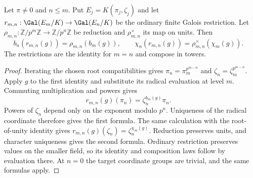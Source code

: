 \begin{lemma}
\label{ft:coordinate-transitions}
\leanok
Let $\pi\ne0$ and $n\leq m$. Put $E_j=K(\pi_j,\zeta_j)$ and
let $r_{m,n}:\Gal(E_m/K)\to\Gal(E_n/K)$ be the ordinary finite
Galois restriction. Let $\rho_{m,n}:\mathbb Z/p^m\mathbb Z\to
\mathbb Z/p^n\mathbb Z$ be reduction and $\rho_{m,n}^{\times}$ its
map on units. Then
\[
 b_n(r_{m,n}(g))=\rho_{m,n}(b_m(g)),\qquad
 \chi_n(r_{m,n}(g))=\rho_{m,n}^{\times}(\chi_m(g)).
\]
The restrictions are the identity for $m=n$ and compose in towers.
\end{lemma}
\begin{proof}
Iterating the chosen root compatibilities gives
$\pi_n=\pi_m^{p^{m-n}}$ and $\zeta_n=\zeta_m^{p^{m-n}}$.
Apply $g$ to the first identity and substitute its radical evaluation
at level $m$. Commuting multiplication and powers gives
\[
 r_{m,n}(g)(\pi_n)=\zeta_n^{b_m(g)}\pi_n.
\]
Powers of $\zeta_n$ depend only on the exponent modulo $p^n$.
Uniqueness of the radical coordinate therefore gives the first formula.
The same calculation with the root-of-unity identity gives
$r_{m,n}(g)(\zeta_n)=\zeta_n^{\chi_m(g)}$. Reduction preserves units,
and character uniqueness gives the second formula. Ordinary restriction
preserves values on the smaller field, so its identity and composition
laws follow by evaluation there. At $n=0$ the target coordinate groups
are trivial, and the same formulas apply.
\end{proof}

